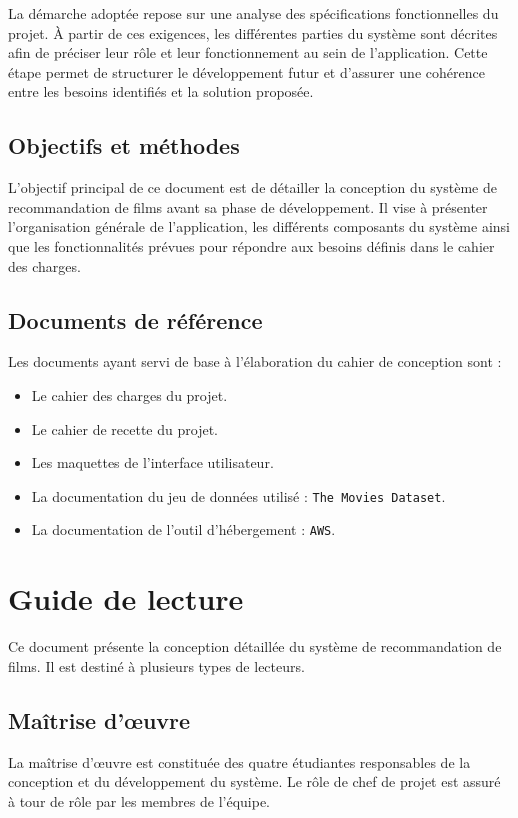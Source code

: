 \documentclass[a4paper,12pt]{report}
\begin{document}
La démarche adoptée repose sur une analyse des spécifications fonctionnelles du projet. À partir de ces exigences, les différentes parties du système sont décrites afin de préciser leur rôle et leur fonctionnement au sein de l'application. Cette étape permet de structurer le développement futur et d'assurer une cohérence entre les besoins identifiés et la solution proposée.

\section{Objectifs et méthodes}
L'objectif principal de ce document est de détailler la conception du système de recommandation de films avant sa phase de développement. Il vise à présenter l'organisation générale de l'application, les différents composants du système ainsi que les fonctionnalités prévues pour répondre aux besoins définis dans le cahier des charges.

\section{Documents de référence}
Les documents ayant servi de base à l’élaboration du cahier de conception sont :

\begin{itemize}
    \item Le cahier des charges du projet.
    \item Le cahier de recette du projet.
    \item Les maquettes de l’interface utilisateur.
    \item La documentation du jeu de données utilisé : \texttt{The Movies Dataset}.
    \item La documentation de l’outil d’hébergement : \texttt{AWS}.
\end{itemize}

\chapter{Guide de lecture}
Ce document présente la conception détaillée du système de recommandation de films. Il est destiné à plusieurs types de lecteurs. 
\section{Maîtrise d'œuvre}

La maîtrise d'œuvre est constituée des quatre étudiantes responsables de la 
conception et du développement du système. Le rôle de chef de projet est 
assuré à tour de rôle par les membres de l'équipe.
\end{document}

